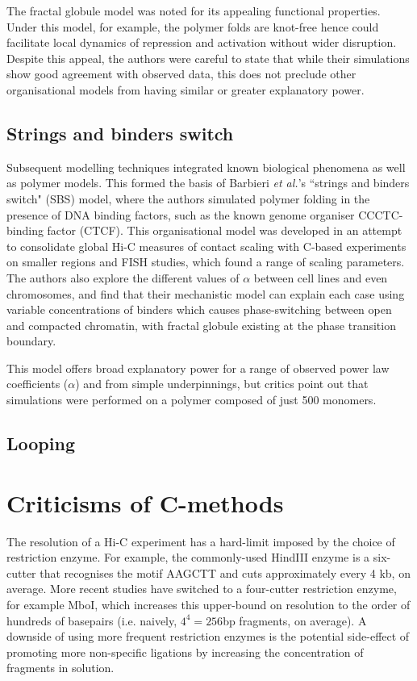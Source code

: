 \documentclass[a4paper,10pt,oneside]{book}
\begin{document}

The fractal globule model was noted for its appealing functional properties. Under this model, for example, the polymer folds are knot-free hence could facilitate local dynamics of repression and activation without wider disruption. Despite this appeal, the authors were careful to state that while their simulations show good agreement with observed data, this does not preclude other organisational models from having similar or greater explanatory power.\cite{Lieberman2009}

\subsection{Strings and binders switch}

Subsequent modelling techniques integrated known biological phenomena as well as polymer models. This formed the basis of Barbieri \emph{et al.}'s\cite{Barbieri2012} ``strings and binders switch" (SBS) model, where the authors simulated polymer folding in the presence of DNA binding factors, such as the known genome organiser CCCTC-binding factor (CTCF).\cite{Phillips2009} This organisational model was developed in an attempt to consolidate global Hi-C measures of contact scaling with C-based experiments on smaller regions and FISH studies, which found a range of scaling parameters. The authors also explore the different values of $\alpha$ between cell lines and even chromosomes, and find that their mechanistic model can explain each case using variable concentrations of binders which causes phase-switching between open and compacted chromatin, with fractal globule existing at the phase transition boundary.

This model offers broad explanatory power for a range of observed power law coefficients ($\alpha$) and from simple underpinnings, but critics point out that simulations were performed on a polymer composed of just 500 monomers.

\subsection{Looping}

\section{Criticisms of C-methods}

The resolution of a Hi-C experiment has a hard-limit imposed by the choice of restriction enzyme. For example, the commonly-used HindIII enzyme is a six-cutter that recognises the motif AAGCTT and cuts approximately every 4 kb, on average.\cite{DeWit2012} More recent studies have switched to a four-cutter restriction enzyme, for example MboI,\cite{Rao2014} which increases this upper-bound on resolution to the order of hundreds of basepairs (i.e. naively, $4^{4} = 256$bp fragments, on average). A downside of using more frequent restriction enzymes is the potential side-effect of promoting more non-specific ligations by increasing the concentration of fragments in solution.\cite{Rao2014} 
\end{document}
